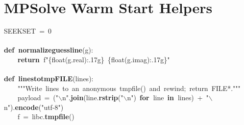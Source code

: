 \documentclass{article}\usepackage[]{graphicx}\usepackage[dvipsnames,table]{xcolor}
\makeatletter
\newcommand{\hlnum}[1]{\textcolor[rgb]{0.686,0.059,0.569}{#1}}%
\newcommand{\hlsng}[1]{\textcolor[rgb]{0.192,0.494,0.8}{#1}}%
\newcommand{\hlcom}[1]{\textcolor[rgb]{0.678,0.584,0.686}{\textit{#1}}}%
\newcommand{\hlopt}[1]{\textcolor[rgb]{0,0,0}{#1}}%
\newcommand{\hldef}[1]{\textcolor[rgb]{0.345,0.345,0.345}{#1}}%
\newcommand{\hlkwa}[1]{\textcolor[rgb]{0.161,0.373,0.58}{\textbf{#1}}}%
\newcommand{\hlkwb}[1]{\textcolor[rgb]{0.69,0.353,0.396}{#1}}%
\newcommand{\hlkwd}[1]{\textcolor[rgb]{0.737,0.353,0.396}{\textbf{#1}}}%
\let\hlipl\hlkwb
\newenvironment{kframe}{%
 \def\at@end@of@kframe{}%
 \ifinner\ifhmode%
  \def\at@end@of@kframe{\end{minipage}}%
  \begin{minipage}{\columnwidth}%
 \fi\fi%
 \def\FrameCommand##1{\hskip\@totalleftmargin \hskip-\fboxsep
 \colorbox{shadecolor}{##1}\hskip-\fboxsep
     \hskip-\linewidth \hskip-\@totalleftmargin \hskip\columnwidth}%
 \MakeFramed {\advance\hsize-\width
   \@totalleftmargin\z@ \linewidth\hsize
   \@setminipage}}%
 {\par\unskip\endMakeFramed%
 \at@end@of@kframe}
\newenvironment{knitrout}{}{} %
\let\hlesc\hldef \let\hlpps\hldef \let\hllin\hldef \let\hlslc\hlcom \let\hlppc\hlcom
\makeatother
\begin{document}
\section{MPSolve Warm Start Helpers}
\begin{center}
\begin{minipage}[m]{18cm}
\begin{knitrout}\small
{}\color{fgcolor}\begin{kframe}
\noindent
\ttfamily
\hldef{\textunderscore SEEK\textunderscore SET\ }\hlopt{=\ }\hldef{}\hlnum{0}\hspace*{\fill}\\
\hldef{}\hspace*{\fill}\\
\hldef{}\hlkwa{def\ }\hldef{}\hlkwd{\textunderscore normalize\textunderscore guess\textunderscore line}\hldef{}\hlopt{(}\hldef{g}\hlopt{):}\hspace*{\fill}\\
\hldef{}\hldef{\ \ \ \ }\hldef{}\hlkwa{return\ }\hldef{f}\hlsng{"}\hlipl{\{float(g.real):.17g\}\ \{float(g.imag):.17g\}}\hlsng{"}\hldef{}\hspace*{\fill}\\
\hldef{}\hspace*{\fill}\\
\hldef{}\hlkwa{def\ }\hldef{}\hlkwd{\textunderscore lines\textunderscore to\textunderscore tmpFILE}\hldef{}\hlopt{(}\hldef{lines}\hlopt{):}\hspace*{\fill}\\
\hldef{}\hldef{\ \ \ \ }\hldef{}\hlsng{"""Write\ lines\ to\ an\ anonymous\ tmpfile()\ and\ rewind;\ return\ FILE{*}."""}\hldef{}\hspace*{\fill}\\
\hldef{}\hldef{\ \ \ \ }\hldef{payload\ }\hlopt{=\ (}\hldef{}\hlsng{"}\hlesc{$\backslash$n}\hlsng{"}\hldef{}\hlopt{.}\hldef{}\hlkwd{join}\hldef{}\hlopt{(}\hldef{line}\hlopt{.}\hldef{}\hlkwd{rstrip}\hldef{}\hlopt{(}\hldef{}\hlsng{"}\hlesc{$\backslash$n}\hlsng{"}\hldef{}\hlopt{)\ }\hldef{}\hlkwa{for\ }\hldef{line\ }\hlkwa{in\ }\hldef{lines}\hlopt{)\ +\ }\hldef{}\hlsng{"}\hlesc{$\backslash$n}\hlsng{"}\hldef{}\hlopt{).}\hldef{}\hlkwd{encode}\hldef{}\hlopt{(}\hldef{}\hlsng{"utf{-}8"}\hldef{}\hlopt{)}\hspace*{\fill}\\
\hldef{}\hldef{\ \ \ \ }\hldef{f\ }\hlopt{=\ }\hldef{\textunderscore libc}\hlopt{.}\hldef{}\hlkwd{tmpfile}\hldef{}\hlopt{()}\hspace*{\fill}\\

\end{kframe}
\end{knitrout}
\end{minipage}
\end{center}
\end{document}
